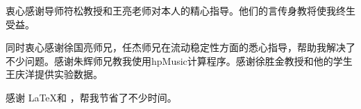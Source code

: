 \begin{acknowledgement}
  衷心感谢导师符松教授和王亮老师对本人的精心指导。他们的言传身教将使我终生受益。

  同时衷心感谢徐国亮师兄，任杰师兄在流动稳定性方面的悉心指导，帮助我解决了不少问题。感谢朱辉师兄教我使用hpMusic计算程序。感谢徐胜金教授和他的学生王庆洋提供实验数据。

  感谢 \LaTeX 和 \thuthesis\cite{thuthesis}，帮我节省了不少时间。
\end{acknowledgement}
